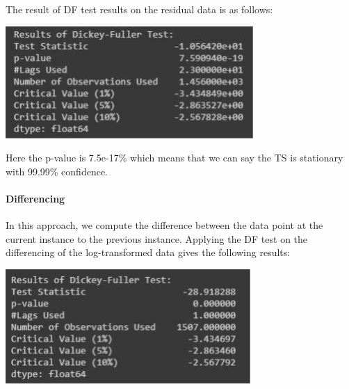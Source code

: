 			The result of DF test results on the residual data is as follows:

				\begin{center}
				\includegraphics[width=\linewidth]{figures/DF-Test-Results-on-residual-data.jpg}	
				\label{fig: DF Test Results on residual data}
				\end{center}

			Here the p-value is 7.5e-17\% which means that we can say the TS is stationary with 99.99\% confidence.

		\paragraph{Differencing}

			In this approach, we compute the difference between the data point at the current instance to the previous instance. Applying the DF test on the differencing of the log-transformed data gives the following results:

				\begin{center}
				\includegraphics[width=\linewidth]{figures/DF-Test-Results-for-log-transformed-Closing-price-after-differencing.jpg}	
				\label{fig: DF Test Results for log-transformed Closing price after differencing}
				\end{center}

